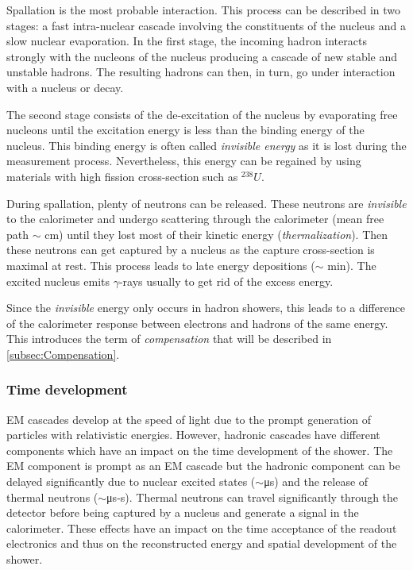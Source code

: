 Spallation is the most probable interaction. This process can be described in two stages: a fast intra-nuclear cascade involving the constituents of the nucleus and a slow nuclear evaporation. In the first stage, the incoming hadron interacts strongly with the nucleons of the nucleus producing a cascade of new stable and unstable hadrons. The resulting hadrons can then, in turn, go under interaction with a nucleus or decay.

The second stage consists of the de-excitation of the nucleus by evaporating free nucleons until the excitation energy is less than the binding energy of the nucleus. This binding energy is often called \textit{invisible energy} as it is lost during the measurement process. Nevertheless, this energy can be regained by using materials with high fission cross-section such as $^{238}U$.

During spallation, plenty of neutrons can be released. These neutrons are \textit{invisible} to the calorimeter and undergo scattering through the calorimeter (mean free path $\sim$ cm) until they lost most of their kinetic energy (\textit{thermalization}). Then these neutrons can get captured by a nucleus as the capture cross-section is maximal at rest. This process leads to late energy depositions ($\sim$ min). The excited nucleus emits $\gamma$-rays usually to get rid of the excess energy.

Since the \textit{invisible} energy only occurs in hadron showers, this leads to a difference of the calorimeter response between electrons and hadrons of the same energy. This introduces the term of \textit{compensation} that will be described in \ref{subsec:Compensation}.

\subsubsection{Time development}

EM cascades develop at the speed of light due to the prompt generation of particles with relativistic energies. However, hadronic cascades have different components which have an impact on the time development of the shower. The EM component is prompt as an EM cascade but the hadronic component can be delayed significantly due to nuclear excited states ($\sim$\si{\micro\second}) and the release of thermal neutrons ($\sim$\si{\micro\second}-\si{\second}). Thermal neutrons can travel significantly through the detector before being captured by a nucleus and generate a signal in the calorimeter. These effects have an impact on the time acceptance of the readout electronics and thus on the reconstructed energy and spatial development of the shower.

